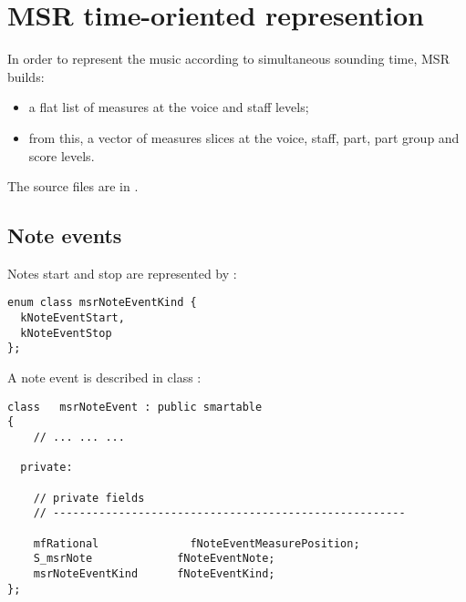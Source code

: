 



\chapter{MSR time-oriented represention}\label{MSR time-oriented represention}

In order to represent the music according to simultaneous sounding time, MSR builds:
\begin{itemize}
\item a flat list of measures at the voice and staff levels;
\item from this, a vector of measures slices at the voice, staff, part, part group and score levels.
\end{itemize}

The source files are in .


\section{Note events}

Notes start and stop are represented by :
\begin{lstlisting}[language=CPlusPlus]
enum class msrNoteEventKind {
  kNoteEventStart,
  kNoteEventStop
};
\end{lstlisting}

A note event is described in class   {\tt }:
\begin{lstlisting}[language=CPlusPlus]
class   msrNoteEvent : public smartable
{
	// ... ... ...

  private:

    // private fields
    // ------------------------------------------------------

    mfRational              fNoteEventMeasurePosition;
    S_msrNote             fNoteEventNote;
    msrNoteEventKind      fNoteEventKind;
};
\end{lstlisting}



